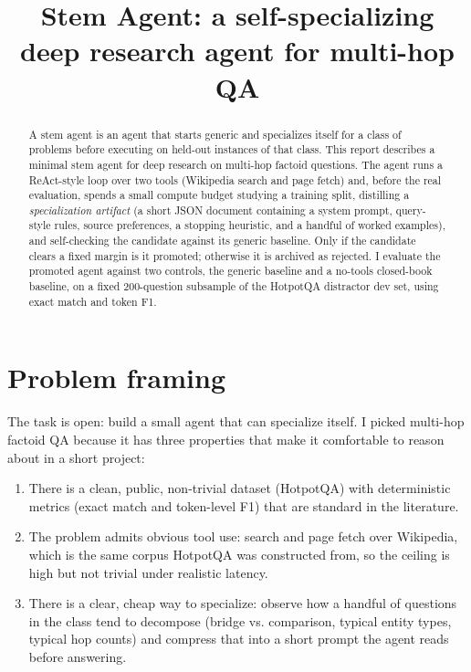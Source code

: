 \documentclass[11pt,a4paper]{article}
\title{Stem Agent: a self-specializing deep research agent for multi-hop QA}
\author{}
\date{}
\begin{document}
\maketitle

\begin{abstract}
A stem agent is an agent that starts generic and specializes itself for a
class of problems before executing on held-out instances of that class.
This report describes a minimal stem agent for deep research on multi-hop
factoid questions. The agent runs a ReAct-style loop over two tools
(Wikipedia search and page fetch) and, before the real evaluation, spends a
small compute budget studying a training split, distilling a
\emph{specialization artifact} (a short JSON document containing a system
prompt, query-style rules, source preferences, a stopping heuristic, and a
handful of worked examples), and self-checking the candidate against its
generic baseline. Only if the candidate clears a fixed margin is it
promoted; otherwise it is archived as rejected. I evaluate the promoted
agent against two controls, the generic baseline and a no-tools
closed-book baseline, on a fixed 200-question subsample of the HotpotQA
distractor dev set, using exact match and token F1.
\end{abstract}

\section{Problem framing}

The task is open: build a small agent that can specialize itself. I picked
multi-hop factoid QA because it has three properties that make it
comfortable to reason about in a short project:

\begin{enumerate}[leftmargin=*]
    \item There is a clean, public, non-trivial dataset (HotpotQA) with
          deterministic metrics (exact match and token-level F1) that are
          standard in the literature.
    \item The problem admits obvious tool use: search and page fetch over
          Wikipedia, which is the same corpus HotpotQA was constructed
          from, so the ceiling is high but not trivial under realistic
          latency.
    \item There is a clear, cheap way to specialize: observe how a handful
          of questions in the class tend to decompose (bridge vs.
          comparison, typical entity types, typical hop counts) and
          compress that into a short prompt the agent reads before
          answering.
\end{enumerate}
\end{document}
